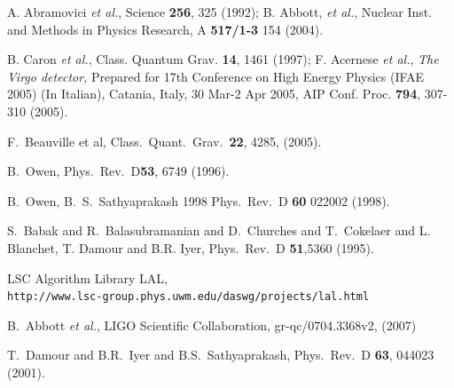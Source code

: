 \documentclass[a4paper,10pt]{article}
\begin{document}
\begin{thebibliography}{99}
A. Abramovici {\it et al.}, Science {\bf 256}, 325 (1992);
B. Abbott, {\it et al.}, Nuclear Inst. and Methods in Physics 
Research, A {\bf 517/1-3} 154 (2004).

B. Caron {\it et al.}, Class. Quantum Grav. {\bf 14}, 1461 (1997);
F. Acernese {\it et al.}, {\em The Virgo detector,} 
Prepared for 17th Conference on High Energy Physics (IFAE 2005) (In Italian), 
Catania, Italy, 30 Mar-2 Apr 2005,  AIP Conf. Proc. {\bf 794}, 307-310 (2005).

F.~Beauville et al, Class.\ Quant.\ Grav.\ \textbf{22}, 4285, (2005).

B.~Owen, Phys.\ Rev.\  D\textbf {53}, 6749 (1996).

 B.~Owen, B.~S.~Sathyaprakash 1998 Phys.\ Rev.\ 
D \textbf{60} 022002 (1998).

S.~Babak and R.~Balasubramanian and D.~Churches and T.~Cokelaer and
\bibitem{BDI95} L. Blanchet, T. Damour and B.R. Iyer, Phys.\ Rev.\ D {\bf 51},5360 (1995).

 LSC Algorithm Library LAL,\\
{\tt http://www.lsc-group.phys.uwm.edu/daswg/\-projects/lal.html}

B.~Abbott {\it et al.}, LIGO Scientific Collaboration, gr-qc/0704.3368v2,
(2007)

T.~Damour and B.R.~Iyer and B.S.~Sathyaprakash, Phys.\ Rev.\ D
\textbf{63}, 044023 (2001).

\end{thebibliography}


\label{theend}
\end{document}
